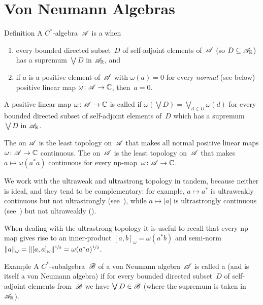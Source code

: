 \documentclass[a]{subfiles}
\begin{document}
\chapter{Von Neumann Algebras}
%
%
\begin{parsec}[vna]%
\begin{point}{Definition}%
A $C^*$-algebra~$\mathscr{A}$
is a 
when
\begin{enumerate}
\item
every bounded directed subset~$D$
of self-adjoint elements of~$\mathscr{A}$ (so $D\subseteq \mathscr{A}_{\mathbb{R}}$) 
has a supremum $\bigvee D$ in $\mathscr{A}_{\mathbb{R}}$, and
\item
if $a$ is a positive element of~$\mathscr{A}$
with $\omega(a)=0$ for every \emph{normal} (see below) positive 
linear map $\omega\colon \mathscr{A}\to \mathbb{C}$,
then~$a=0$.
\end{enumerate}
\begin{point}%
A positive linear map $\omega\colon \mathscr{A}\to \mathbb{C}$
is called 
if $\omega(\bigvee D) = \bigvee_{d\in D} \omega(d)$
for every bounded directed subset of self-adjoint elements of~$D$
which has a supremum $\bigvee D$ in $\mathscr{A}_{\mathbb{R}}$.
\end{point}%
\begin{point}%
The  on $\mathscr{A}$
is the least topology on~$\mathscr{A}$
that makes all normal positive linear maps $\omega\colon \mathscr{A}\to \mathbb{C}$
continuous.
The  on~$\mathscr{A}$
is the least topology on~$\mathscr{A}$
that makes $a\mapsto \omega(a^*a)$ continuous
for every np-map~$\omega\colon \mathscr{A}\to \mathbb{C}$.
\end{point}
\end{point}
\begin{point}%
We work with the ultraweak and ultrastrong topology in tandem,
because neither is ideal, and they tend to be complementary:
for example, $a\mapsto a^*$ is ultraweakly continuous
but not ultrastrongly (see~\TODO{}), 
while $a\mapsto \left|a\right|$
is ultrastrongly continuous (see~\TODO{}) but not ultraweakly
(\TODO{}).

When dealing with the ultrastrong topology
it is useful to recall that
every np-map gives rise
to an inner-product $[a,b]_\omega = \omega(a^*b)$
and semi-norm $\|a\|_\omega = \|[a,a]_\omega\|^{\nicefrac{1}{2}}
= \omega(a^*a)^{\nicefrac{1}{2}}$.
\end{point}
\end{parsec}
\begin{parsec}%
\begin{point}{Example}%
A $C^*$-subalgebra~$\mathscr{B}$
of a von Neumann algebra~$\mathscr{A}$
is called a 
(and is itself a von Neumann algebra)
if for every bounded directed subset~$D$
of self-adjoint elements from~$\mathscr{B}$
we have $\bigvee D\in\mathscr{B}$
(where the supremum is taken in~$\mathscr{A}_{\mathbb{R}}$).
\end{point}

\end{parsec}
\end{document}
